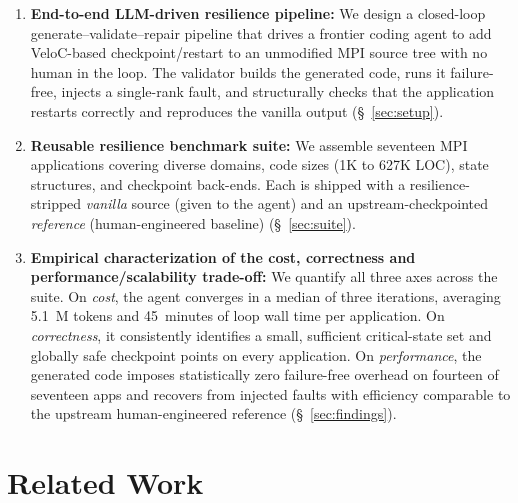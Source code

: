 \documentclass[conference]{IEEEtran}
\begin{document}
\begin{enumerate}[topsep=0pt,itemsep=0pt,leftmargin=12pt]
\item \textbf{End-to-end LLM-driven resilience pipeline:}
We design a closed-loop generate--validate--repair pipeline that drives a frontier coding agent to add VeloC-based checkpoint/restart to an unmodified MPI source tree with no human in the loop. The validator builds the generated code, runs it failure-free, injects a single-rank fault, and structurally checks that the application restarts correctly and reproduces the vanilla output (\S~\ref{sec:setup}).

\item \textbf{Reusable resilience benchmark suite:} We assemble seventeen MPI applications covering diverse domains, code sizes (1K to 627K LOC), state structures, and checkpoint back-ends. Each is shipped with a resilience-stripped \emph{vanilla} source (given to the agent) and an upstream-checkpointed \emph{reference} (human-engineered baseline) (\S~\ref{sec:suite}).

\item \textbf{Empirical characterization of the cost, correctness and performance/scalability trade-off:} We quantify all three axes across the suite. On \emph{cost}, the agent converges in a median of three iterations, averaging 5.1~M tokens and 45~minutes of loop wall time per application. On \emph{correctness}, it consistently identifies a small, sufficient critical-state set and globally safe checkpoint points on every application. On \emph{performance}, the generated code imposes statistically zero failure-free overhead on fourteen of seventeen apps and recovers from injected faults with efficiency comparable to the upstream human-engineered reference (\S~\ref{sec:findings}).
\end{enumerate}


\section{Related Work}
\end{document}
